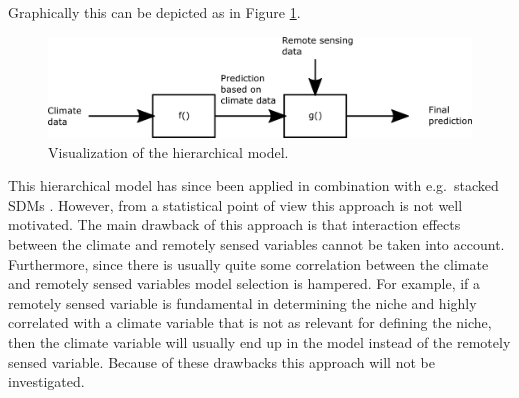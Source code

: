 Graphically this can be depicted as in Figure \ref{fig:chClassificationTechniques:HierarchicalClassification}.\\

\begin{figure}[!htb]
\centering
\includegraphics[scale=0.5]{VectorGraphics/HierarchicalClassification.png}
\caption{\label{fig:chClassificationTechniques:HierarchicalClassification}Visualization of the hierarchical model.}
\end{figure}

This hierarchical model has since been applied in combination with e.g.\ stacked SDMs \parencite{cord_remote_2014}. However, from a statistical point of view this approach is not well motivated. The main drawback of this approach is that interaction effects between the climate and remotely sensed variables cannot be taken into account. Furthermore, since there is usually quite some correlation between the climate and remotely sensed variables model selection is hampered. For example, if a remotely sensed variable is fundamental in determining the niche and highly correlated with a climate variable that is not as relevant for defining the niche, then the climate variable will usually end up in the model instead of the remotely sensed variable. Because of these drawbacks this approach will not be investigated.







